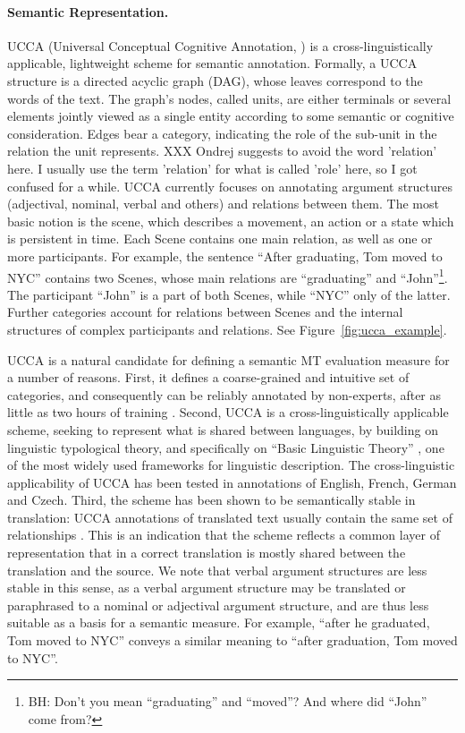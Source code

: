\documentclass[11pt]{article}
\newcommand{\figref}[1]{Figure~\ref{#1}}
\newcommand{\XXX}[1]{{\color{red}XXX #1}} %
\newcommand{\oa}[1]{\footnote{\color{red}OA: #1}}
\newcommand{\bh}[1]{\footnote{\color{blue}BH: #1}}
\def\inparcite#1{\newcite{#1}}
\begin{document}
\paragraph{Semantic Representation.}
UCCA (Universal Conceptual Cognitive Annotation, \inparcite{abend2013universal}) is a cross-linguistically applicable, lightweight
scheme for semantic annotation. Formally, a UCCA structure is a directed acyclic graph (DAG),
whose leaves correspond to the words of the text.
The graph’s nodes, called {\sc units}, are either terminals or several elements jointly
viewed as a single entity according to some semantic or cognitive consideration. Edges bear
a category, indicating the role of the sub-unit in the relation the unit
represents. \XXX{Ondrej suggests to avoid the word 'relation' here. I usually use the
term 'relation' for what is called 'role' here, so I got confused for a while.}
UCCA
currently focuses on annotating argument structures (adjectival, nominal, verbal and others) and
relations between them. The most basic notion is the {\sc scene}, which describes a movement, an
action or a state which is persistent in time. Each Scene contains one main relation, as well
as one or more participants. For example, the sentence ``After graduating, Tom moved to NYC''
contains two Scenes, whose main relations are ``graduating'' and ``John''\bh{Don't you mean ``graduating'' and
``moved''? And where did ``John'' come from?}. The participant ``John''
is a part of both Scenes, while ``NYC'' only of the latter. Further categories account for
relations between Scenes and the internal structures of complex participants and relations.
See \figref{fig:ucca_example}.

UCCA is a natural candidate for defining a semantic
MT evaluation measure for a number of reasons. 
First, it defines a coarse-grained and intuitive set of categories,
and consequently can be reliably annotated by non-experts, after as little as two hours
of training \cite{marinotti2014}.
Second, UCCA is a cross-linguistically applicable scheme, seeking to represent what is shared between languages,
by building on linguistic typological theory, and specifically on ``Basic Linguistic Theory''
\cite{Dixon:10a,Dixon:10b,Dixon:12}, one of the most widely used frameworks for linguistic description.
The cross-linguistic applicability of UCCA has been tested in annotations of
English, French, German and Czech.
Third, the scheme has been shown to be semantically stable
in translation: UCCA annotations of translated text usually contain the same set of relationships
\cite{sulem2015conceptual}. This is an indication that the scheme reflects
a common layer of representation that in a correct translation
is mostly shared between the translation and the source. 
We note that verbal argument structures are less stable in this sense, as a verbal
argument structure may be translated or paraphrased to a nominal or adjectival
argument structure, and are thus less suitable as a basis for a semantic measure.
For example, ``after he graduated, Tom moved to NYC''
conveys a similar meaning to ``after graduation, Tom moved to NYC''. 
\end{document}
